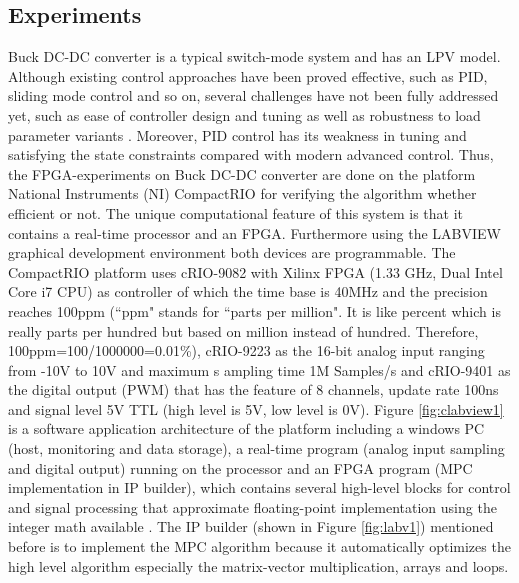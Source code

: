\documentclass[journal]{IEEEtran}
\begin{document}
\subsection{Experiments}

Buck DC-DC converter is a typical switch-mode system and has an LPV model. Although existing control approaches have been proved effective, such as PID, sliding mode control and so on, several challenges have not been fully addressed yet, such as ease of controller design and tuning as well as robustness to load parameter variants \cite{quevedo2014predictive}. Moreover, PID control has its weakness in tuning and satisfying the state constraints compared with modern advanced control. Thus, the FPGA-experiments on Buck DC-DC converter are done on the platform National Instruments (NI) CompactRIO for verifying the algorithm whether efficient or not. The unique computational feature of this system is that it contains a real-time processor and an FPGA. Furthermore using the LABVIEW graphical development environment both devices are programmable. The CompactRIO platform uses cRIO-9082 with Xilinx FPGA (1.33 GHz, Dual Intel Core i7 CPU) as controller of which the time base is 40MHz and the precision reaches 100ppm (``ppm" stands for ``parts per million". It is like percent which is really parts per hundred but based on million instead of hundred. Therefore, 100ppm=100/1000000=0.01\%), cRIO-9223 as the 16-bit analog input ranging from -10V to 10V and maximum s ampling time 1M Samples/s and cRIO-9401 as the digital output (PWM) that has the feature of 8 channels, update rate 100ns and signal level 5V TTL (high level is 5V, low level is 0V). Figure \ref{fig:clabview1} is a software application architecture of the platform including a windows PC (host, monitoring and data storage), a real-time program (analog input sampling and digital output) running on the processor and an FPGA program (MPC implementation in IP builder), which contains several high-level blocks for control and signal processing that approximate floating-point implementation using the integer math available \cite{dase2006motorcycle}. The IP builder (shown in Figure \ref{fig:labv1}) mentioned before is to implement the MPC algorithm because it automatically optimizes the high level algorithm especially the matrix-vector multiplication, arrays and loops.
\end{document}
